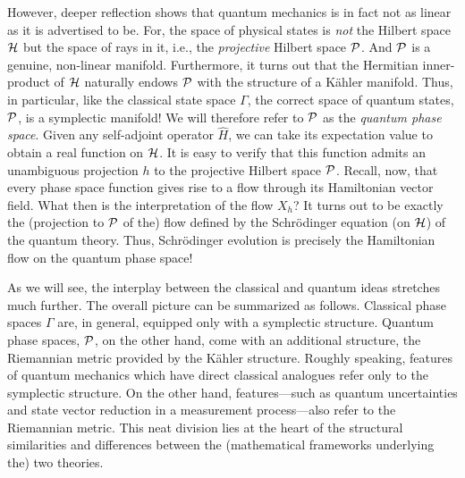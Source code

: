 \documentclass[12pt,aps,eqsecnum,tighten,nofootinbib]{revtex4-2}
\def\H{{\cal H}}
\def\P{{\cal P}}
\begin{document}
However, deeper reflection shows that quantum mechanics is in fact not
as linear as it is advertised to be. For, the space of physical states
is {\it not} the Hilbert space $\H$ but the space of rays in it, i.e.,
the {\it projective} Hilbert space $\P$. And $\P$ is a genuine,
non-linear manifold. Furthermore, it turns out that the Hermitian
inner-product of $\H$ naturally endows $\P$ with the structure of a
K\"ahler manifold. Thus, in particular, like the classical state space
$\Gamma$, the correct space of quantum states, $\P$, is a symplectic
manifold! We will therefore refer to $\P$ as the {\it quantum phase
space}. Given any self-adjoint operator $\hat{H}$, we can take its
expectation value to obtain a real function on $\H$. It is easy to
verify that this function admits an unambiguous projection $h$ to the
projective Hilbert space $\P$. Recall, now, that every phase space
function gives rise to a flow through its Hamiltonian vector field.
What then is the interpretation of the flow $X_h$? It turns out
\cite{kibble} to be exactly the (projection to $\P$ of the) flow
defined by the Schr\"odinger equation (on $\H$) of the quantum theory.
Thus, Schr\"odinger evolution is precisely the Hamiltonian flow on the
quantum phase space!

As we will see, the interplay between the classical and quantum ideas
stretches much further. The overall picture can be summarized as
follows. Classical phase spaces $\Gamma$ are, in general, equipped
only with a symplectic structure.  Quantum phase spaces, $\P$, on the
other hand, come with an additional structure, the Riemannian metric
provided by the K\"ahler structure.  Roughly speaking, features of
quantum mechanics which have direct classical analogues refer only to
the symplectic structure.  On the other hand, features---such as
quantum uncertainties and state vector reduction in a measurement
process---also refer to the Riemannian metric. This neat division lies at
the heart of the structural similarities and differences between the
(mathematical frameworks underlying the) two theories.
\end{document}
